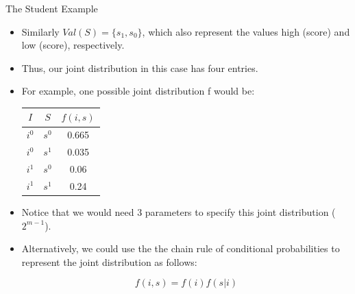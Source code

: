 \documentclass[handout]{beamer}
\begin{document}
\begin{frame}{The Student Example}
\scriptsize{
\begin{itemize}

\item Similarly $Val(S) = \{s_1 , s_0 \}$, which
also represent the values high (score) and low (score), respectively.

\item Thus, our joint distribution in this case has four entries. 
\item For example, one possible joint distribution f would be:

\begin{table}
\centering
  \begin{tabular}{cc|c} \hline
$I$ & $S$ & $f(i,s)$  \\ \hline
$i^0$ & $s^0$ & 0.665 \\
$i^0$ & $s^1$ & 0.035 \\
$i^1$ & $s^0$ & 0.06 \\
$i^1$ & $s^1$ & 0.24 
\end{tabular} 
\end{table}

\item Notice that we would need 3 parameters to specify this joint distribution ($2^{m-1}$).

\item Alternatively, we could use the the chain rule of conditional probabilities to represent the joint distribution as follows:

\begin{displaymath}
 f(i,s) = f(i)f(s|i)
\end{displaymath}

\end{itemize}



} 

\end{frame}
\end{document}
